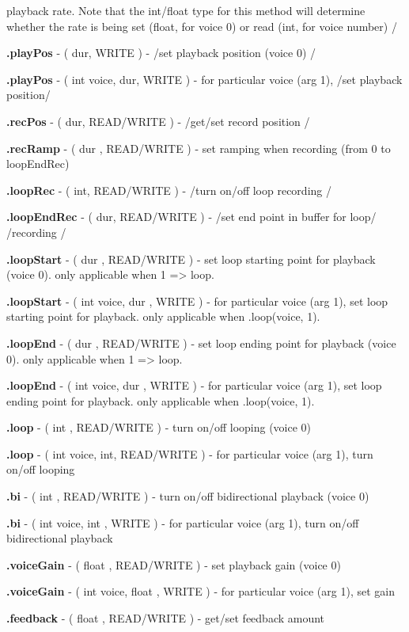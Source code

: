 {\begin{chuckitemize}
      playback rate. Note that the int/float type for this method will
      determine whether the rate is being set (float, for voice 0) or
      read (int, for voice number) /
    \item {\bf .playPos} - ( dur, WRITE ) - /set playback position (voice 0) /
    \item {\bf .playPos} - ( int voice, dur, WRITE ) - for particular voice (arg
      1), /set playback position/
    \item {\bf .recPos} - ( dur, READ/WRITE ) - /get/set record position /
    \item {\bf .recRamp} - ( dur , READ/WRITE ) - set ramping when recording
      (from 0 to loopEndRec)
    \item {\bf .loopRec} - ( int, READ/WRITE ) - /turn on/off loop recording /
    \item {\bf .loopEndRec} - ( dur, READ/WRITE ) - /set end point in buffer for
      loop/ /recording /
    \item {\bf .loopStart} - ( dur , READ/WRITE ) - set loop starting point for
      playback (voice 0). only applicable when 1 => loop.
    \item {\bf .loopStart} - ( int voice, dur , WRITE ) - for particular voice
      (arg 1), set loop starting point for playback. only applicable
      when .loop(voice, 1).
    \item {\bf .loopEnd} - ( dur , READ/WRITE ) - set loop ending point for
      playback (voice 0). only applicable when 1 => loop.
    \item {\bf .loopEnd} - ( int voice, dur , WRITE ) - for particular voice
      (arg 1), set loop ending point for playback. only applicable when
      .loop(voice, 1).
    \item {\bf .loop} - ( int , READ/WRITE ) - turn on/off looping (voice 0)
    \item {\bf .loop} - ( int voice, int, READ/WRITE ) - for particular voice
      (arg 1), turn on/off looping
    \item {\bf .bi} - ( int , READ/WRITE ) - turn on/off bidirectional playback
      (voice 0)
    \item {\bf .bi} - ( int voice, int , WRITE ) - for particular voice (arg 1),
      turn on/off bidirectional playback
    \item {\bf .voiceGain} - ( float , READ/WRITE ) - set playback gain (voice 0)
    \item {\bf .voiceGain} - ( int voice, float , WRITE ) - for particular voice
      (arg 1), set gain
    \item {\bf .feedback} - ( float , READ/WRITE ) - get/set feedback amount

\end{chuckitemize}}
